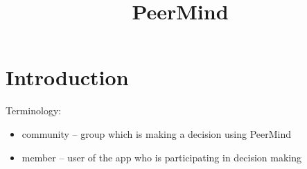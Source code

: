 \documentclass{sigchi}
\begin{document}
\title{PeerMind}


\maketitle

\begin{abstract}


\end{abstract}



\section{Introduction}

Terminology:
\begin{itemize}
\item community -- group which is making a decision using PeerMind
\item member -- user of the app who is participating in decision making
\end{itemize}

\end{document}
